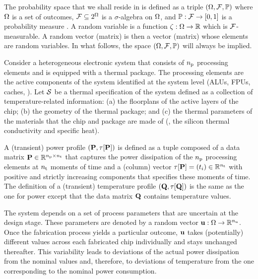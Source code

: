 
The probability space that we shall reside in is defined as a triple $(\Omega, \mathcal{F}, \mathbb{P})$ where $\Omega$ is a set of outcomes, $\mathcal{F} \subseteq 2^\Omega$ is a $\sigma$-algebra on $\Omega$, and $\mathbb{P}: \mathcal{F} \to [0, 1]$ is a probability measure \cite{xiu2010}.
A random variable is a function $\zeta: \Omega \to \mathbb{R}$ which is $\mathcal{F}$-measurable.
A random vector (matrix) is then a vector (matrix) whose elements are random variables.
In what follows, the space $(\Omega, \mathcal{F}, \mathbb{P})$ will always be implied.

Consider a heterogeneous electronic system that consists of ${n_\text{p}}$ processing elements and is equipped with a thermal package.
The processing elements are the active components of the system identified at the system level (ALUs, FPUs, caches, \etc).
Let $\mathcal{S}$ be a thermal specification of the system defined as a collection of temperature-related information: (a) the floorplans of the active layers of the chip; (b) the geometry of the thermal package; and (c) the thermal parameters of the materials that the chip and package are made of (\eg, the silicon thermal conductivity and specific heat).

A (transient) power profile $\profileP$ is defined as a tuple composed of a data matrix $\mP \in \real^{\nprocs \times \nsteps}$ that captures the power dissipation of the ${n_\text{p}}$ processing elements at ${n_\text{t}}$ moments of time and a (column) vector $\partition{\mP} = (\t_i) \in \real^{\nsteps}$ with positive and strictly increasing components that specifies these moments of time.
The definition of a (transient) temperature profile $\profileT$ is the same as the one for power except that the data matrix $\mTO$ contains temperature values.

The system depends on a set of process parameters that are uncertain at the design stage.
These parameters are denoted by a random vector $\mathbf{u}: \Omega \to \mathbb{R}^{n_\text{u}}$.
Once the fabrication process yields a particular outcome, $\mathbf{u}$ takes (potentially) different values across each fabricated chip individually and stays unchanged thereafter.
This variability leads to deviations of the actual power dissipation from the nominal values and, therefore, to deviations of temperature from the one corresponding to the nominal power consumption.

